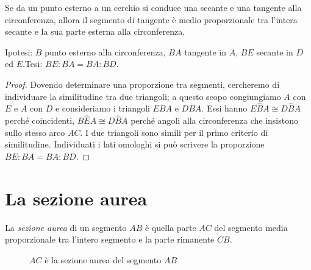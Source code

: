\begin{teorema}
Se da un punto esterno a un cerchio si conduce una secante e una 
tangente alla circonferenza, allora il segmento di tangente è medio 
proporzionale tra l'intera secante e la sua parte esterna alla 
circonferenza.
\end{teorema}

\noindent Ipotesi: \(B\) punto esterno alla circonferenza, \(BA\) 
tangente in \(A\), \(BE\) secante in \(D\) ed \(E\).\tab Tesi: \(BE:BA=BA:BD\).

\noindent\begin{minipage}{0.65\textwidth}\parindent15pt
\begin{proof}
Dovendo determinare una proporzione tra segmenti, cercheremo di 
individuare la similitudine tra due triangoli; a questo scopo 
congiungiamo \(A\) con \(E\) e \(A\) con \(D\) e consideriamo i triangoli 
\(EBA\) e \(DBA\). Essi hanno \(E\widehat{B}A\cong D\widehat{B}A\) perché 
coincidenti, \(B\widehat{E}A\cong D\widehat{B}A\) perché angoli alla 
circonferenza che insistono sullo stesso arco \(AC\). I due triangoli 
sono simili per il primo criterio di similitudine. Individuati i lati 
omologhi si può scrivere la proporzione \(BE:BA=BA:BD\).
\end{proof}
\end{minipage}\hfil
\begin{minipage}{0.35\textwidth}
	\centering
\end{minipage}\vspace{5pt}

\section{La sezione aurea}\label{sect:sezione_aurea}

\begin{definizione}
La \emph{sezione aurea} di un segmento \(AB\) è quella parte \(AC\) del 
segmento media proporzionale tra l'intero segmento e la parte 
rimanente \(CB\).
\end{definizione}


\begin{inaccessibleblock}
 \begin{figure}[!htb]
	\centering
	\caption{\(AC\) è la sezione aurea del segmento 
\(AB\)}\label{fig:sez_aurea}
\end{figure}
\end{inaccessibleblock}

